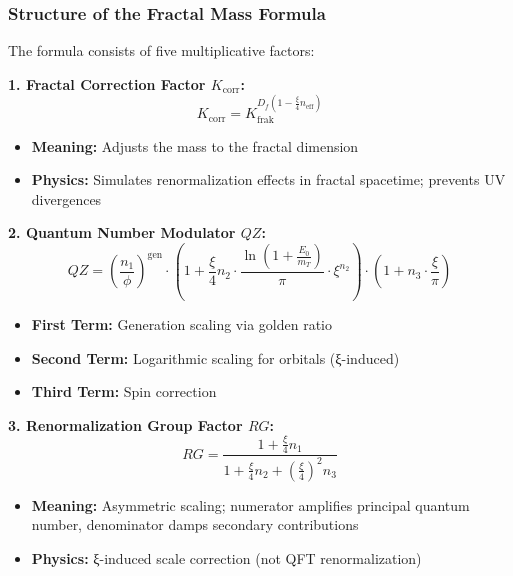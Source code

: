 	\subsubsection{Structure of the Fractal Mass Formula}
	
	The formula consists of five multiplicative factors:
	
	\textbf{1. Fractal Correction Factor $K_{\text{corr}}$:}
	\begin{equation}
		K_{\text{corr}} = K_{\text{frak}}^{D_f \left(1 - \frac{\xi}{4} n_{\text{eff}}\right)}
	\end{equation}
	\begin{itemize}
		\item \textbf{Meaning:} Adjusts the mass to the fractal dimension
		\item \textbf{Physics:} Simulates renormalization effects in fractal spacetime; prevents UV divergences
	\end{itemize}
	
	\textbf{2. Quantum Number Modulator $QZ$:}
	\begin{equation}
		QZ = \left( \frac{n_1}{\phi} \right)^{\text{gen}} \cdot \left(1 + \frac{\xi}{4} n_2 \cdot \frac{\ln\left(1 + \frac{E_0}{m_T}\right)}{\pi} \cdot \xi^{n_2}\right) \cdot \left(1 + n_3 \cdot \frac{\xi}{\pi}\right)
	\end{equation}
	\begin{itemize}
		\item \textbf{First Term:} Generation scaling via golden ratio
		\item \textbf{Second Term:} Logarithmic scaling for orbitals (ξ-induced)
		\item \textbf{Third Term:} Spin correction
	\end{itemize}
	
	\textbf{3. Renormalization Group Factor $RG$:}
	\begin{equation}
		RG = \frac{1 + \frac{\xi}{4} n_1}{1 + \frac{\xi}{4} n_2 + \left(\frac{\xi}{4}\right)^2 n_3}
	\end{equation}
	\begin{itemize}
		\item \textbf{Meaning:} Asymmetric scaling; numerator amplifies principal quantum number, denominator damps secondary contributions
		\item \textbf{Physics:} ξ-induced scale correction (not QFT renormalization)
	\end{itemize}
	

